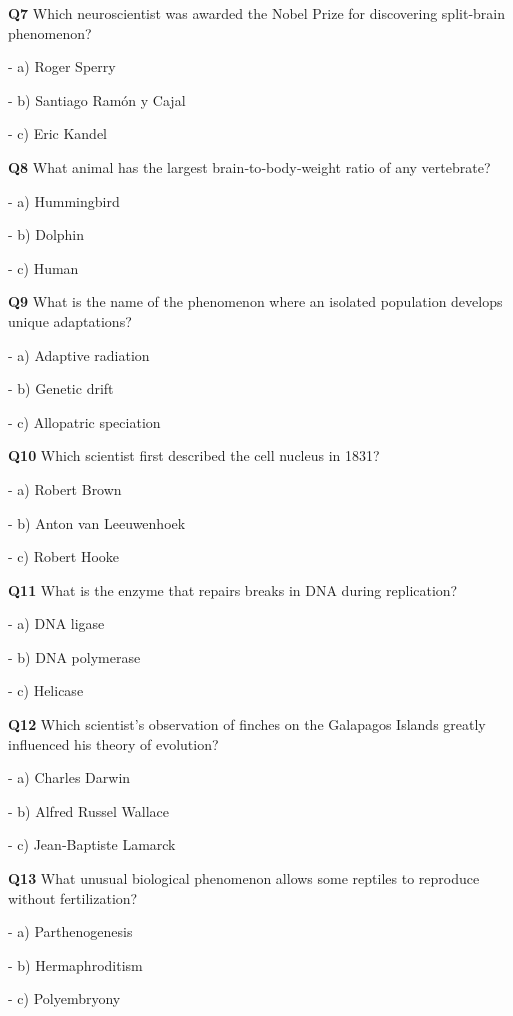 \textbf{Q7} Which neuroscientist was awarded the Nobel Prize for discovering split‑brain phenomenon?\par
\quad - a) Roger Sperry\par
\quad - b) Santiago Ramón y Cajal\par
\quad - c) Eric Kandel\par

\textbf{Q8} What animal has the largest brain‑to‑body‑weight ratio of any vertebrate?\par
\quad - a) Hummingbird\par
\quad - b) Dolphin\par
\quad - c) Human\par

\textbf{Q9} What is the name of the phenomenon where an isolated population develops unique adaptations?\par
\quad - a) Adaptive radiation\par
\quad - b) Genetic drift\par
\quad - c) Allopatric speciation\par

\textbf{Q10} Which scientist first described the cell nucleus in 1831?\par
\quad - a) Robert Brown\par
\quad - b) Anton van Leeuwenhoek\par
\quad - c) Robert Hooke\par

\textbf{Q11} What is the enzyme that repairs breaks in DNA during replication?\par
\quad - a) DNA ligase\par
\quad - b) DNA polymerase\par
\quad - c) Helicase\par

\textbf{Q12} Which scientist's observation of finches on the Galapagos Islands greatly influenced his theory of evolution?\par
\quad - a) Charles Darwin\par
\quad - b) Alfred Russel Wallace\par
\quad - c) Jean‑Baptiste Lamarck\par

\textbf{Q13} What unusual biological phenomenon allows some reptiles to reproduce without fertilization?\par
\quad - a) Parthenogenesis\par
\quad - b) Hermaphroditism\par
\quad - c) Polyembryony\par

